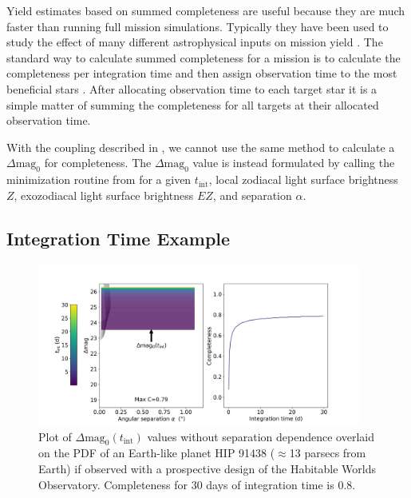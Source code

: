 Yield estimates based on summed completeness are useful because they are much
faster than running full mission simulations. Typically they have been used to
study the effect of many different astrophysical inputs on mission yield
\citep{starkMaximizingExoEarthCandidate2014, Stark2016,
starkExoEarthYieldLandscape2019}. The standard way to calculate summed
completeness for a mission is to calculate the completeness per integration
time and then assign observation time to the most beneficial stars
\citep{hunyadiSingleVisitCompleteness2005,
starkMaximizingExoEarthCandidate2014}. After allocating observation time to
each target star it is a simple matter of summing the completeness for all
targets at their allocated observation time.


With the coupling described in , we cannot use the same
method to calculate a $\Delta\textrm{mag}_0$ for completeness. The
$\Delta\textrm{mag}_0$ value is instead formulated by calling the minimization
routine from  for a given $t_\textrm{int}$, local zodiacal
light surface brightness $Z$, exozodiacal light surface brightness
$EZ$, and separation $\alpha$.

\subsection{Integration Time Example}
\label{sub:comp_per_inttime}

\begin{figure}
  \begin{center}
    \includegraphics[width=0.95\textwidth]{ch3/figures/default_dmag_curve.png}
  \end{center}
  \caption{Plot of $\Delta\textrm{mag}_0(t_\textrm{int})$ values without separation dependence
  overlaid on the PDF of an Earth-like planet HIP 91438 ($\approx$13 parsecs from Earth)
  if observed with a prospective design of the Habitable Worlds Observatory.
  Completeness for 30 days of integration time is 0.8.}
  \label{fig:default_dmag_curve}
\end{figure}

